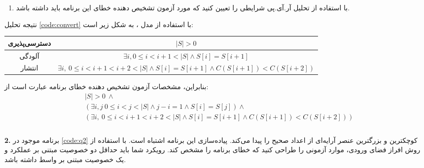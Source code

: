 \documentclass{article}
\newenvironment{answer}{}{\\[.3ex]}
\newenvironment{question}[1]{\textbf{#1.} }{}
\newenvironment{qitem}[1]{%
	\begin{enumerate}\item[(#1)]}{\end{enumerate}}
\begin{document}
\begin{qitem}{e}
با استفاده از تحلیل آر.آی.پی شرایطی را تعیین کنید که مورد آزمون تشخیص دهنده خطای این برنامه باید داشته باشد.
\end{qitem}
\begin{answer}
نتیجه تحلیل \autoref{code:convert} با استفاده از مدل ، به شکل زیر است:

\begin{table}[h]
	\centering
\begin{tabular}{c|c}
	دسترسی‌پذیری & $|S| > 0$\\\hline
	آلودگی & $\exists i, 0 \leq i < i + 1 < |S| \wedge S[i]=S[i+1]$\\\hline
	انتشار &
	$\exists i,\ 0 \leq i < i + 1 < i + 2 < |S| \wedge S[i]=S[i+1] \wedge C(S[i+1]) < C(S[i+2])$
\end{tabular}
\end{table}
بنابراین، مشخصات آزمون تشخیص دهنده خطای برنامه عبارت است از:
\begin{align*}
	&|S| > 0\ \wedge\\
	&\left(\exists i, j\ 0 \leq i < j < |S| \wedge j - i = 1 \wedge S[i]=S[j]\right) \wedge\\
	& \left(\exists i,\ 0 \leq i < i + 1 < i + 2 < |S| \wedge S[i]=S[i+1] \wedge C(S[i+1]) < C(S[i+2])\right)\\
\end{align*}
\end{answer}
\begin{question}{2}
برنامه موجود در \autoref{code:q2} کوچکترین و بزرگترین عنصر آرایه‌ای از اعداد صحیح را پیدا می‌کند. پیاده‌سازی این برنامه اشتباه است. با استفاده از روش افراز فضای ورودی، موارد آزمونی را طراحی کنید که خطای برنامه را مشخص کند. رویکرد شما باید حداقل دو خصوصیت مبتنی بر عملکرد و یک خصوصیت مبتنی بر واسط داشته باشد.
\end{question}
\end{document}

